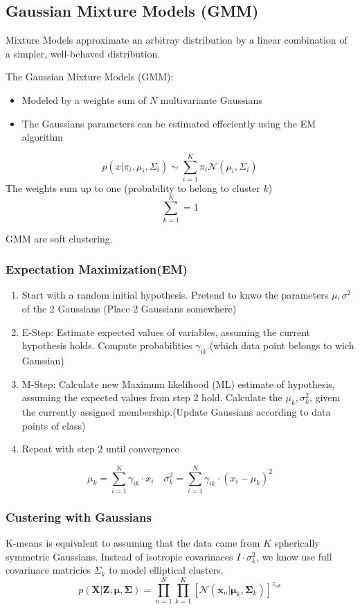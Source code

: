 \subsection{Gaussian Mixture Models (GMM)}
Mixture Models approximate an arbitray distribution by a linear combination of a simpler, well-behaved distribution.

The Gaussian Mixture Models (GMM):
\begin{itemize}
    \item Modeled by a weighte sum of \(N\) multivariante Gaussians
    \item The Gaussians parameters can be estimated effeciently using the EM algorithm
\end{itemize}
\[
p(x|\pi_i,\mu_i,\Sigma_i) \sim \sum_{i = 1}^{K}\pi_i \mathcal{N}(\mu_i,\Sigma_i)
\]
The weights sum up to one (probability to belong to cluster \(k\))
\[
\sum_{k = 1}^{K} = 1
\]

GMM are soft clustering.

\subsubsection{Expectation Maximization(EM)}
\begin{enumerate}
    \item Start with a random initial hypothesis. Pretend to knwo the parameters \(\mu,\sigma^2\) of the 2 Gaussians (Place 2 Gaussians somewhere)
    \item E-Step: Estimate expected values of variables, assuming the current hypothesis holds. Compute probabilities \(\gamma_{ik}\).(which data point belongs to wich Gaussian)
    \item M-Step: Calculate new Maximum likelihood (ML) estimate of hypothesis, assuming the expected values from step 2 hold. Calculate the \(\mu_k,\sigma_k^2\), givem the currently assigned membership.(Update Gaussians according to data points of class)
    \item Repeat with step 2 until convergence
\end{enumerate}
\[
\mu_k = \sum_{i = 1}^{K} \gamma_{ik}\cdot x_i \quad \sigma_k^2 = \sum_{i = 1}^{N} \gamma_{ik}\cdot (x_i-\mu_k)^2
\]
\subsubsection{Custering with Gaussians}
K-means is equivalent to assuming that the data came from \(K\) spherically symmetric Gaussians.
Instead of isotropic covarinaces \(I \cdot \sigma_k^2\), we know use full covarinace matricies \(\Sigma_k\) to model elliptical clusters.
\[
p(\mathbf{X|Z,\mu,\Sigma}) = \prod_{n = 1}^{N}\prod_{k = 1}^{K}\left[\mathcal{N}(\mathbf{x}_n|\mathbf{\mu}_k,\mathbf{\Sigma}_k)\right]^{z_{nk}}
\]

